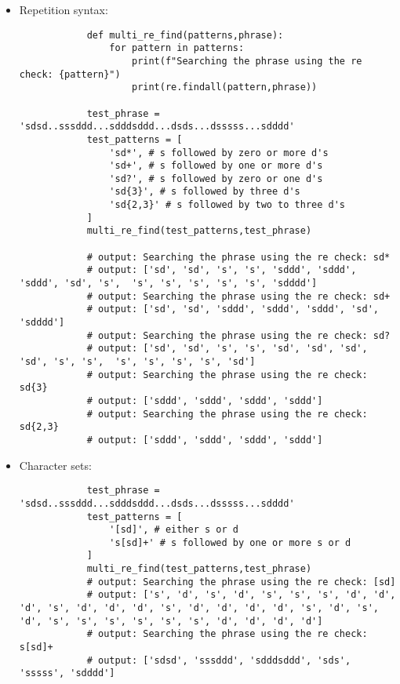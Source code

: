 \begin{itemize}
    \item Repetition syntax: 
        \begin{verbatim}
            def multi_re_find(patterns,phrase):
                for pattern in patterns: 
                    print(f"Searching the phrase using the re check: {pattern}")
                    print(re.findall(pattern,phrase))

            test_phrase = 'sdsd..sssddd...sdddsddd...dsds...dsssss...sdddd'
            test_patterns = [
                'sd*', # s followed by zero or more d's
                'sd+', # s followed by one or more d's
                'sd?', # s followed by zero or one d's
                'sd{3}', # s followed by three d's 
                'sd{2,3}' # s followed by two to three d's
            ]
            multi_re_find(test_patterns,test_phrase)

            # output: Searching the phrase using the re check: sd*
            # output: ['sd', 'sd', 's', 's', 'sddd', 'sddd', 'sddd', 'sd', 's',  's', 's', 's', 's', 's', 'sdddd']
            # output: Searching the phrase using the re check: sd+
            # output: ['sd', 'sd', 'sddd', 'sddd', 'sddd', 'sd', 'sdddd']
            # output: Searching the phrase using the re check: sd?
            # output: ['sd', 'sd', 's', 's', 'sd', 'sd', 'sd', 'sd', 's', 's',  's', 's', 's', 's', 'sd']
            # output: Searching the phrase using the re check: sd{3}
            # output: ['sddd', 'sddd', 'sddd', 'sddd']
            # output: Searching the phrase using the re check: sd{2,3}
            # output: ['sddd', 'sddd', 'sddd', 'sddd']
        \end{verbatim}
    
    \item Character sets: 
        \begin{verbatim}
            test_phrase = 'sdsd..sssddd...sdddsddd...dsds...dsssss...sdddd'
            test_patterns = [
                '[sd]', # either s or d
                's[sd]+' # s followed by one or more s or d
            ]
            multi_re_find(test_patterns,test_phrase)
            # output: Searching the phrase using the re check: [sd]
            # output: ['s', 'd', 's', 'd', 's', 's', 's', 'd', 'd', 'd', 's', 'd', 'd', 'd', 's', 'd', 'd', 'd', 'd', 's', 'd', 's', 'd', 's', 's', 's', 's', 's', 's', 'd', 'd', 'd', 'd']
            # output: Searching the phrase using the re check: s[sd]+
            # output: ['sdsd', 'sssddd', 'sdddsddd', 'sds', 'sssss', 'sdddd']
        \end{verbatim}
    

\end{itemize}

